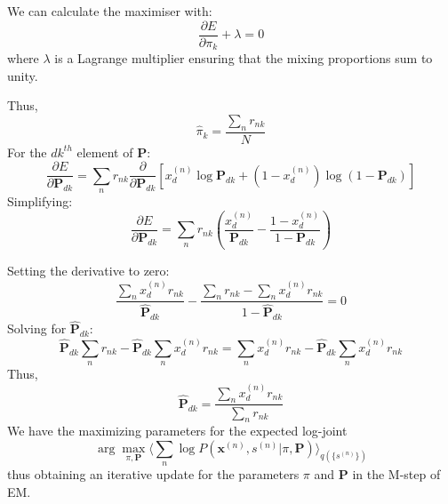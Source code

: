 \documentclass[12pt]{article}
\begin{document}
\begin{enumerate}
We can calculate the maximiser with:
$$\frac{\partial E}{\partial \pi_k} + \lambda = 0$$
where $\lambda$ is a Lagrange multiplier ensuring that the mixing proportions sum to unity.

Thus,
$$\hat \pi_k = \frac{\sum_{n}r_{nk}}{N}$$
For the $dk^{th}$ element of $\mathbf{P}$:
$$\frac{\partial E}{\partial \mathbf{P}_{dk}} = \sum_n r_{nk}\frac{\partial}{\partial \mathbf{P}_{dk}}[x^{(n)}_{d}\log \mathbf{P}_{dk}+(1-x^{(n)}_{d}) \log(1-\mathbf{P}_{dk})]$$
Simplifying:
$$\frac{\partial E}{\partial \mathbf{P}_{dk}} = \sum_n r_{nk}(\frac{x^{(n)}_{d}}{ \mathbf{P}_{dk}}-\frac{1-x^{(n)}_{d}}{1-\mathbf{P}_{dk}})$$

Setting the derivative to zero:
$$\frac{\sum_n  x^{(n)}_{d}r_{nk}}{\hat{\mathbf{P}}_{dk}}-\frac{\sum_n r_{nk}-\sum_n  x^{(n)}_{d}r_{nk}}{1-\hat{\mathbf{P}}_{dk}} = 0$$
Solving for $\hat{\mathbf{P}}_{dk}$:
$$\hat{\mathbf{P}}_{dk}\sum_n r_{nk}-\hat{\mathbf{P}}_{dk}\sum_n x^{(n)}_{d}r_{nk} = \sum_n  x^{(n)}_{d}r_{nk}-\hat{\mathbf{P}}_{dk}\sum_n  x^{(n)}_{d}r_{nk}$$
Thus,
$$\hat{\mathbf{P}}_{dk} = \frac{\sum_n x^{(n)}_{d}r_{nk}}{\sum_n r_{nk}}$$
We have the maximizing parameters for the expected log-joint
$$\arg \max_{\pi, \mathbf{P}} \Bigg\langle \sum_n \log P(\textbf{x}^{(n)}, s^{(n)}| \pi, \mathbf{P})\Bigg\rangle_{q(\{s^{(n)}\})}$$
thus obtaining an iterative update for the parameters $\pi$ and $\mathbf{P}$ in the M-step of EM.


\end{enumerate}
\end{document}

